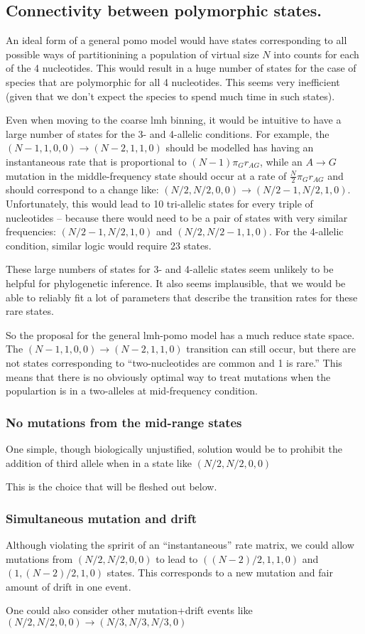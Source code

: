\documentclass{llncs}
\begin{document}
\subsection*{Connectivity between polymorphic states.}
An ideal form of a general pomo model would have states corresponding to all possible ways of partitionining
    a population of virtual size $N$ into counts for each of the 4 nucleotides.
This would result in a huge number of states for the case of species that are polymorphic for all 4 nucleotides.
This seems very inefficient (given that we don't expect the species to spend much time in such states).

Even when moving to the coarse lmh binning, it would be intuitive to have a large number of states
    for the 3- and 4-allelic conditions.
For example, the $(N-1,1, 0,0) \rightarrow (N-2,1,1,0)$ should be modelled has having an instantaneous rate that
    is proportional to $(N-1)\pi_G r_{AG}$, while an $A\rightarrow G$ mutation in the middle-frequency state
    should occur at a rate of $\frac{N}{2}\pi_G r_{AG}$ and should correspond to a change like:
    $(N/2,N/2, 0,0) \rightarrow (N/2 - 1,N/2,1,0)$.
Unfortunately, this would lead to 10 tri-allelic states for every triple of nucleotides -- because there would need to be 
    a pair of states with very similar frequencies: $(N/2-1,N/2,1,0)$ and $(N/2,N/2 - 1,1,0)$.
For the 4-allelic condition, similar logic would require 23 states.

These large numbers of states for 3- and 4-allelic states seem unlikely to be helpful for phylogenetic inference.
It also seems implausible, that we would be able to reliably fit a lot of parameters that describe the transition 
    rates for these rare states.

So the proposal for the general lmh-pomo model has a much reduce state space.
The $(N-1,1, 0,0) \rightarrow (N-2,1,1,0)$ transition can still occur, but there are not states corresponding to 
``two-nucleotides are common and 1 is rare.''
This means that there is no obviously optimal way to treat mutations when the populartion is in a two-alleles at mid-frequency
    condition.

\subsubsection*{No mutations from the mid-range states}
One simple, though biologically unjustified, solution would be to prohibit the addition of third allele when in a state like $(N/2, N/2, 0, 0)$

This is the choice that will be fleshed out below.

\subsubsection*{Simultaneous mutation and drift}
Although violating the spririt of an ``instantaneous'' rate matrix, we
could allow mutations from $(N/2, N/2, 0, 0)$ to lead to $((N-2)/2, 1, 1, 0)$ and $(1, (N-2)/2, 1, 0)$ states.
This corresponds to a new mutation and fair amount of drift in one event.

One could also consider other mutation+drift events like $(N/2, N/2, 0, 0)\rightarrow(N/3, N/3, N/3, 0)$


\end{document}

